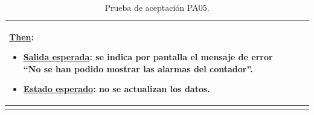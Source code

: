\documentclass[pdftex,11pt,a4paper]{book}
\begin{document}
\begin{center}
\begin{longtable}{|>{\centering\arraybackslash}X m{2cm}|m{12cm}|}
\begin{enumerate}
\end{enumerate}
\break

\underline{Then}:
\vspace{-3mm}
\begin{itemize}
\addtolength{\itemsep}{-3mm}
\item \underline{Salida esperada}: se indica por pantalla el mensaje de error “No se han podido mostrar las alarmas del contador”.
\item \underline{Estado esperado}: no se actualizan los datos.
\end{itemize}
\\ \hline

\caption{Prueba de aceptación PA05.} \label{tablalarga:tablaPA05}
\end{longtable}
\end{center}



\renewcommand{\tablename}{Tabla}
\renewcommand{\arraystretch}{1,7}
\end{document}
